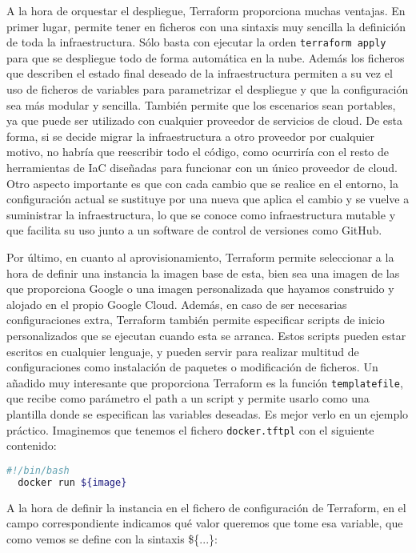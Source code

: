   A la hora de orquestar el despliegue, Terraform proporciona muchas ventajas. En primer lugar, permite tener en ficheros con una sintaxis muy sencilla la definición de toda la infraestructura. Sólo basta con ejecutar la orden \texttt{terraform apply} para que se despliegue todo de forma automática en la nube. Además los ficheros que describen el estado final deseado de la infraestructura permiten a su vez el uso de ficheros de variables para parametrizar el despliegue y que la configuración sea más modular y sencilla. También permite que los escenarios sean portables, ya que puede ser utilizado con cualquier proveedor de servicios de cloud. De esta forma, si se decide migrar la infraestructura a otro proveedor por cualquier motivo, no habría que reescribir todo el código, como ocurriría con el resto de  herramientas de IaC diseñadas para funcionar con un único proveedor de cloud. Otro aspecto importante es que con cada cambio que se realice en el entorno, la configuración actual se sustituye por una nueva que aplica el cambio y se vuelve a suministrar la infraestructura, lo que se conoce como infraestructura mutable y que facilita su uso junto a un software de control de versiones como GitHub.

  Por último, en cuanto al aprovisionamiento, Terraform permite seleccionar a la hora de definir una instancia la imagen base de esta, bien sea una imagen de las que proporciona Google o una imagen personalizada que hayamos construido y alojado en el propio Google Cloud. Además, en caso de ser necesarias configuraciones extra, Terraform también permite especificar scripts de inicio personalizados que se ejecutan cuando esta se arranca. Estos scripts pueden estar escritos en cualquier lenguaje, y pueden servir para realizar multitud de configuraciones como instalación de paquetes o modificación de ficheros. Un añadido muy interesante que proporciona Terraform es la función \texttt{templatefile}, que recibe como parámetro el path a un script y permite usarlo como una plantilla donde se especifican las variables deseadas. Es mejor verlo en un ejemplo práctico. Imaginemos que tenemos el fichero \texttt{docker.tftpl} con el siguiente contenido: \\

  \begin{lstlisting}[language=Bash, caption=Contenido del fichero docker.tftpl]
  #!/bin/bash
  docker run ${image}\end{lstlisting}

  A la hora de definir la instancia en el fichero de configuración de Terraform, en el campo correspondiente indicamos qué valor queremos que tome esa variable, que como vemos se define con la sintaxis \$\{...\}: \\
  

